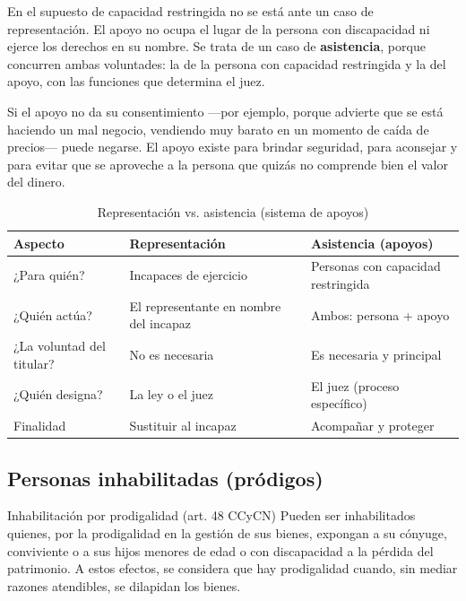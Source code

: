 \documentclass[12pt,oneside]{book}
\begin{document}
En el supuesto de capacidad restringida no se está ante un caso de representación. El apoyo no ocupa el lugar de la persona con discapacidad ni ejerce los derechos en su nombre. Se trata de un caso de \textbf{asistencia}, porque concurren ambas voluntades: la de la persona con capacidad restringida y la del apoyo, con las funciones que determina el juez.

\begin{note}
Si el apoyo no da su consentimiento —por ejemplo, porque advierte que se está haciendo un mal negocio, vendiendo muy barato en un momento de caída de precios— puede negarse. El apoyo existe para brindar seguridad, para aconsejar y para evitar que se aproveche a la persona que quizás no comprende bien el valor del dinero.
\end{note}

\begin{table}[H]
\centering
\caption{Representación vs. asistencia (sistema de apoyos)}
\begin{tabularx}{\textwidth}{>{\raggedright\arraybackslash}p{} X X}
\toprule
\textbf{Aspecto} & \textbf{Representación} & \textbf{Asistencia (apoyos)} \\
\midrule
¿Para quién? & Incapaces de ejercicio & Personas con capacidad restringida \\
¿Quién actúa? & El representante en nombre del incapaz & Ambos: persona + apoyo \\
¿La voluntad del titular? & No es necesaria & Es necesaria y principal \\
¿Quién designa? & La ley o el juez & El juez (proceso específico) \\
Finalidad & Sustituir al incapaz & Acompañar y proteger \\
\bottomrule
\end{tabularx}
\end{table}

\subsection{Personas inhabilitadas (pródigos)}

\begin{definition}{Inhabilitación por prodigalidad (art. 48 CCyCN)}
Pueden ser inhabilitados quienes, por la prodigalidad en la gestión de sus bienes, expongan a su cónyuge, conviviente o a sus hijos menores de edad o con discapacidad a la pérdida del patrimonio. A estos efectos, se considera que hay prodigalidad cuando, sin mediar razones atendibles, se dilapidan los bienes.
\end{definition}
\end{document}
